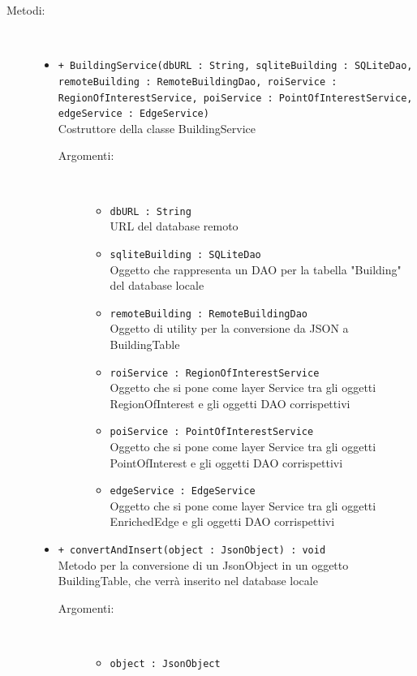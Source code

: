 \documentclass[../DefinizioneDiProdotto.tex]{subfiles}
\begin{document}
\begin{description}
\begin{itemize}
\end{itemize}
\item[Metodi:] \
\begin{itemize}
\item \texttt{+ BuildingService(dbURL : String, sqliteBuilding : SQLiteDao, remoteBuilding : RemoteBuildingDao, roiService :\\RegionOfInterestService, poiService : PointOfInterestService, edgeService : EdgeService)}\\
Costruttore della classe BuildingService
 \begin{description}
\item[Argomenti:] \
\begin{itemize}
\item \texttt{dbURL : String}\\
URL del database remoto\item \texttt{sqliteBuilding : SQLiteDao}\\
Oggetto che rappresenta un DAO per la tabella "Building" del database locale\item \texttt{remoteBuilding : RemoteBuildingDao}\\
Oggetto di utility per la conversione da JSON a BuildingTable\item \texttt{roiService : RegionOfInterestService}\\
Oggetto che si pone come layer Service tra gli oggetti RegionOfInterest e gli oggetti DAO corrispettivi\item \texttt{poiService : PointOfInterestService}\\
Oggetto che si pone come layer Service tra gli oggetti PointOfInterest e gli oggetti DAO corrispettivi\item \texttt{edgeService : EdgeService}\\
Oggetto che si pone come layer Service tra gli oggetti EnrichedEdge e gli oggetti DAO corrispettivi\end{itemize}
\end{description}
\item \texttt{+ convertAndInsert(object : JsonObject) : void}\\
Metodo per la conversione di un JsonObject in un oggetto BuildingTable, che verrà inserito nel database locale
 \begin{description}
\item[Argomenti:] \
\begin{itemize}
\item \texttt{object : JsonObject}\\

\end{itemize}
\end{description}
\end{itemize}
\end{description}
\end{document}
